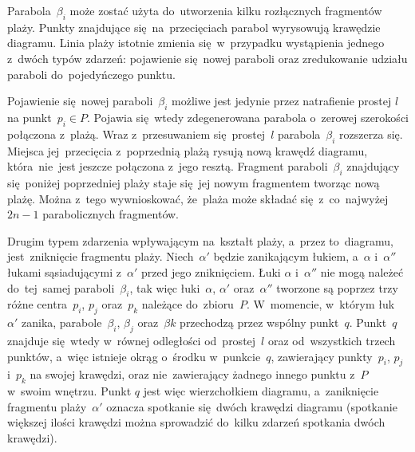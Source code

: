 \documentclass[skorowidz,autorrok,backref,xodstep,oswiadczenie]{wmimgr}
\begin{document}
Parabola~$\beta_{i}$ może zostać użyta do~utworzenia kilku rozłącznych fragmentów plaży. Punkty znajdujące się~na~przecięciach parabol wyrysowują krawędzie diagramu. Linia plaży istotnie zmienia się~w~przypadku wystąpienia jednego z~dwóch typów zdarzeń: pojawienie się~nowej paraboli oraz zredukowanie udziału paraboli do~pojedyńczego punktu.

Pojawienie się~nowej paraboli~$\beta_{i}$ możliwe jest jedynie przez natrafienie prostej $l$ na punkt~$p_{i} \in P$. Pojawia się~wtedy zdegenerowana parabola o~zerowej szerokości połączona z~plażą. Wraz z~przesuwaniem się~prostej~$l$ parabola~$\beta_{i}$ rozszerza się. Miejsca jej~przecięcia z~poprzednią plażą rysują nową krawędź diagramu, która~nie~jest jeszcze połączona z~jego resztą. Fragment paraboli~$\beta_{i}$ znajdujący się~poniżej poprzedniej plaży staje się~jej nowym fragmentem tworząc nową plażę. Można z~tego wywnioskować, że~plaża może składać się~z~co~najwyżej~$2n-1$ parabolicznych fragmentów.

Drugim typem zdarzenia wpływającym na~kształt plaży, a~przez to~diagramu, jest~zniknięcie fragmentu plaży. Niech~$\alpha'$ będzie zanikającym łukiem, a~$\alpha$ i~$\alpha''$ łukami sąsiadującymi z~$\alpha'$ przed jego zniknięciem. Łuki $\alpha$ i~$\alpha''$ nie mogą należeć do~tej~samej paraboli~$\beta_{i}$, tak więc łuki~$\alpha$, $\alpha'$ oraz~$\alpha''$ tworzone są poprzez trzy różne centra~$p_{i}$, $p_{j}$ oraz~$p_{k}$ należące do~zbioru~$P$. W~momencie, w~którym łuk~$\alpha'$ zanika, parabole~$\beta_{i}$, $\beta_{j}$ oraz~$\beta{k}$ przechodzą przez wspólny punkt~$q$. Punkt~$q$ znajduje się~wtedy w~równej odległości od~prostej~$l$ oraz od~wszystkich trzech punktów, a~więc istnieje okrąg o~środku w~punkcie~$q$, zawierający punkty~$p_{i}$, $p_{j}$ i~$p_{k}$ na swojej krawędzi, oraz nie~zawierający żadnego innego punktu z~$P$ w~swoim wnętrzu. Punkt $q$ jest więc wierzchołkiem diagramu, a~zaniknięcie fragmentu plaży~$\alpha'$ oznacza spotkanie się~dwóch krawędzi diagramu (spotkanie większej ilości krawędzi można sprowadzić do~kilku zdarzeń spotkania dwóch krawędzi).
\end{document}
